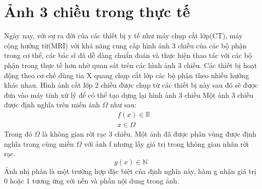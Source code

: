 \documentclass[12pt,oneside,a4]{report}
\begin{document}
\section{Ảnh 3 chiều trong thực tế}
Ngày nay, với sự ra đời của các thiết bị y tế  như máy chụp cắt lớp(CT), máy cộng hưởng từ(MRI) với khả năng cung cấp hình ảnh 3 chiều của các bộ phận trong cơ thể, các bác sĩ đã dễ dàng chuẩn đoán và thực hiện thao tác với các bộ phận trong thực tế hơn nhờ quan sát trên các hình ảnh  3 chiều. Các thiết bị hoạt động theo cơ chế dùng tia X quang chụp cắt lớp các bộ phận theo nhiều hướng khác nhau. Hình ảnh cắt lớp 2 chiều được chụp từ các thiết bị này sau đó sẽ được đưa vào máy tính xử lý để có thể tạo dựng lại hình ảnh 3 chiều 
Một ảnh 3 chiều được định nghĩa trên miền ảnh $\Omega$ như sau: 
\begin{equation}
\begin{split}
&f(x)\in \mathbb{R}\\
&x\in \Omega
\end{split}
\end{equation} 
Trong đó $\Omega$ là không gian rời rạc 3 chiều. Một ảnh đã được phân vùng được định nghĩa trong cùng miền $\Omega$ với ảnh f nhưng lấy giá trị trong không gian nhãn rời rạc. 
\begin{equation}
g(x)\in \mathbb{N}
\end{equation}
Ảnh nhị phân là một trường hợp đặc biệt của định nghĩa này, hàm g nhận giá trị 0 hoặc 1 tương ứng với nền và phần nội dung trong ảnh. 
\end{document}
